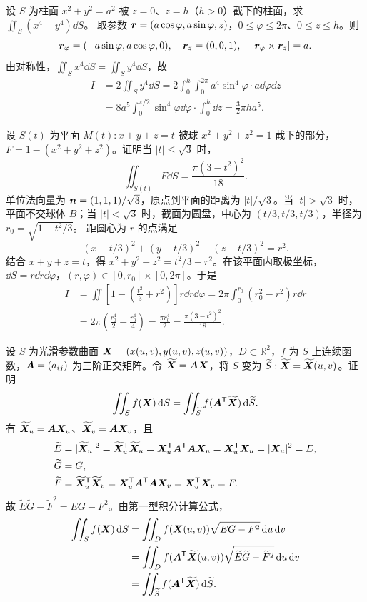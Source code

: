 设 $S$ 为柱面 $x^2+y^2=a^2$ 被 $z=0$、$z=h$（$h>0$）截下的柱面，求 $\iint_S(x^4+y^4)\dd S$。
\sol 取参数 $\bm{r}=(a\cos\varphi,a\sin\varphi,z)$，$0\le\varphi\le2\pi$、$0\le z\le h$。则
\[
\bm{r}_\varphi=(-a\sin\varphi,a\cos\varphi,0),\quad\bm{r}_z=(0,0,1),\quad
|\bm{r}_\varphi\times\bm{r}_z|=a.
\]
由对称性，$\iint_Sx^4\dd S=\iint_Sy^4\dd S$，故
\begin{align*}
I&=2\iint_Sy^4\dd S=2\int_0^h\int_0^{2\pi}a^4\sin^4\varphi\cdot a\dd\varphi\dd z\\
&=8a^5\int_0^{\pi/2}\sin^4\varphi\dd\varphi\cdot\int_0^h\dd z
=\frac32\pi ha^5.
\end{align*}

设 $S(t)$ 为平面 $M(t):x+y+z=t$ 被球 $x^2+y^2+z^2=1$ 截下的部分，$F=1-(x^2+y^2+z^2)$。证明当 $|t|\le\sqrt3$ 时，
\[
\iint_{S(t)}F\dd S=\frac{\pi(3-t^2)^2}{18}.
\]
\prooftext 单位法向量为 $\bm{n}=(1,1,1)/\sqrt3$，原点到平面的距离为 $|t|/\sqrt3$。当 $|t|>\sqrt3$ 时，平面不交球体 $B$；当 $|t|<\sqrt3$ 时，截面为圆盘，中心为 $(t/3,t/3,t/3)$，半径为 $r_0=\sqrt{1-t^2/3}$。
距圆心为 $r$ 的点满足
\[
(x-t/3)^2+(y-t/3)^2+(z-t/3)^2=r^2.
\]
结合 $x+y+z=t$，得 $x^2+y^2+z^2=t^2/3+r^2$。在该平面内取极坐标，$\dd S=r\dd r\dd\varphi$，$(r,\varphi)\in[0,r_0]\times[0,2\pi]$。于是
\begin{align*}
I&=\iint\left[1-\left(\frac{t^2}3+r^2\right)\right]r\dd r\dd\varphi
=2\pi\int_0^{r_0}(r_0^2-r^2)r\dd r\\
&=2\pi\left(\frac{r_0^4}2-\frac{r_0^4}4\right)
=\frac{\pi r_0^4}2=\frac{\pi(3-t^2)^2}{18}.
\end{align*}

设 $S$ 为光滑参数曲面 $\bm{X}=(x(u,v),y(u,v),z(u,v))$，$D\subset\mathbb R^2$，$f$ 为 $S$ 上连续函数，$\bm{A}=(a_{ij})$ 为三阶正交矩阵。令 $\widetilde{\bm{X}}=\bm{A}\bm{X}$，将 $S$ 变为 $\widetilde S:\widetilde{\bm{X}}=\widetilde{\bm{X}}(u,v)$。证明
\[
\iint_Sf(\bm{X})\mathop{}\!\mathrm d S=\iint_{\widetilde S}f(\bm{A}^{\mathsf T}\widetilde{\bm{X}})\mathop{}\!\mathrm d\widetilde S.
\]
\prooftext 有 $\widetilde{\bm{X}}_u=\bm{A}\bm{X}_u$、$\widetilde{\bm{X}}_v=\bm{A}\bm{X}_v$，且
\begin{align*}
\widetilde E&=|\widetilde{\bm{X}}_u|^2=\widetilde{\bm{X}}_u^{\mathsf T}\widetilde{\bm{X}}_u
=\bm{X}_u^{\mathsf T}\bm{A}^{\mathsf T}\bm{A}\bm{X}_u
=\bm{X}_u^{\mathsf T}\bm{X}_u=|\bm{X}_u|^2=E,\\
\widetilde G&=G,\\
\widetilde F&=\widetilde{\bm{X}}_u^{\mathsf T}\widetilde{\bm{X}}_v
=\bm{X}_u^{\mathsf T}\bm{A}^{\mathsf T}\bm{A}\bm{X}_v
=\bm{X}_u^{\mathsf T}\bm{X}_v=F.
\end{align*}
故 $\widetilde E\widetilde G-\widetilde F^2=EG-F^2$。由第一型积分计算公式，
\begin{align*}
\iint_Sf(\bm{X})\mathop{}\!\mathrm d S
&=\iint_Df(\bm{X}(u,v))\sqrt{EG-F^2}\mathop{}\!\mathrm d u\mathop{}\!\mathrm d v\\
&=\iint_Df(\bm{A}^{\mathsf T}\widetilde{\bm{X}}(u,v))\sqrt{\widetilde E\widetilde G-\widetilde F^2}\mathop{}\!\mathrm d u\mathop{}\!\mathrm d v\\
&=\iint_{\widetilde S}f(\bm{A}^{\mathsf T}\widetilde{\bm{X}})\mathop{}\!\mathrm d\widetilde S.
\end{align*}

